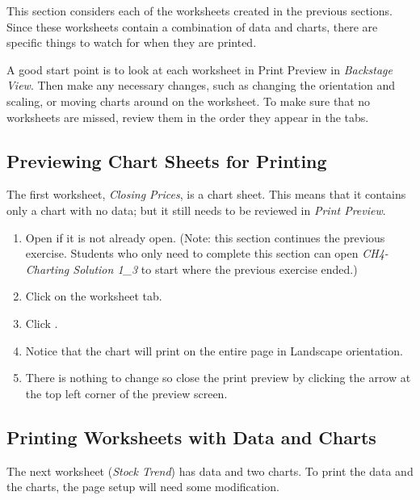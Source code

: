 This section considers each of the worksheets created in the previous sections. Since these worksheets contain a combination of data and charts, there are specific things to watch for when they are printed.

A good start point is to look at each worksheet in Print Preview in \textit{Backstage View}. Then make any necessary changes, such as changing the orientation and scaling, or moving charts around on the worksheet. To make sure that no worksheets are missed, review them in the order they appear in the tabs.

\subsection{Previewing Chart Sheets for Printing}

The first worksheet, \textit{Closing Prices}, is a chart sheet. This means that it contains only a chart with no data; but it still needs to be reviewed in \textit{Print Preview}.

\begin{enumbox}
	\begin{enumerate}
		\item Open  if it is not already open. (Note: this section continues the previous exercise. Students who only need to complete this section can open \textit{CH4-Charting Solution 1\_3} to start where the previous exercise ended.)
		\item Click on the  worksheet tab.
		\item Click .
		\item Notice that the chart will print on the entire page in Landscape orientation.
		\item There is nothing to change so close the print preview by clicking the arrow at the top left corner of the preview screen.
	\end{enumerate}
\end{enumbox}
	
\subsection{Printing Worksheets with Data and Charts}

The next worksheet (\textit{Stock Trend}) has data and two charts. To print the data and the charts, the page setup will need some modification.

